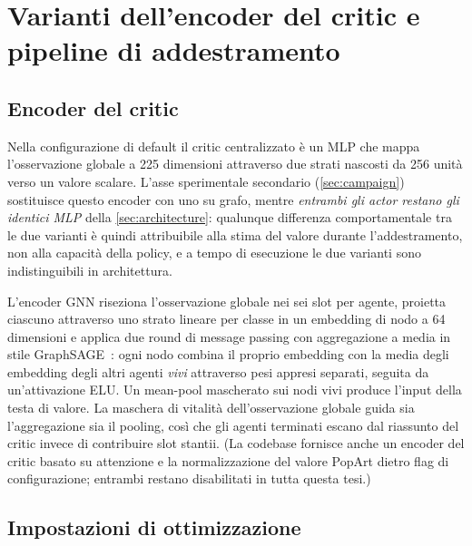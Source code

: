 \section{Varianti dell'encoder del critic e pipeline di addestramento}
\label{sec:critic-variants}

\subsection{Encoder del critic}
\label{sec:critic-encoders}

Nella configurazione di default il critic centralizzato è un MLP che
mappa l'osservazione globale a 225 dimensioni attraverso due strati
nascosti da 256 unità verso un valore scalare. L'asse sperimentale
secondario (\cref{sec:campaign}) sostituisce questo encoder con uno su
grafo, mentre \emph{entrambi gli actor restano gli identici MLP} della
\cref{sec:architecture}: qualunque differenza comportamentale tra le due
varianti è quindi attribuibile alla stima del valore durante
l'addestramento, non alla capacità della policy, e a tempo di esecuzione
le due varianti sono indistinguibili in architettura.

L'encoder GNN riseziona l'osservazione globale nei sei slot per agente,
proietta ciascuno attraverso uno strato lineare per classe in un
embedding di nodo a 64 dimensioni e applica due round di message passing
con aggregazione a media in stile
GraphSAGE~\cite{hamilton2017graphsage}: ogni nodo combina il proprio
embedding con la media degli embedding degli altri agenti \emph{vivi}
attraverso pesi appresi separati, seguita da un'attivazione ELU. Un
mean-pool mascherato sui nodi vivi produce l'input della testa di
valore. La maschera di vitalità dell'osservazione globale guida sia
l'aggregazione sia il pooling, così che gli agenti terminati escano dal
riassunto del critic invece di contribuire slot stantii. (La codebase
fornisce anche un encoder del critic basato su attenzione e la
normalizzazione del valore PopArt dietro flag di configurazione;
entrambi restano disabilitati in tutta questa tesi.)

\subsection{Impostazioni di ottimizzazione}
\label{sec:optimization}

